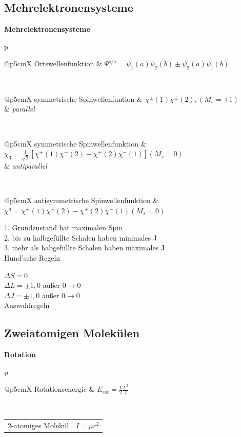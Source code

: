 \documentclass[12pt,a4paper, twoside]{article}
\makeatletter
\renewcommand{\=}[1]{\stackrel{#1}{=}}
\theoremstyle{definition}
\theoremstyle{remark}
\newcommand{\concept}[2]{%
\noindent
\begin{framed}
\noindent\textbf{#1}
\par\begin{tabular}{p{\linewidth}}
#2
\end{tabular}
\end{framed}
}
\newcommand{\fnote}[3]{%
\noindent\begin{tabularx}{\linewidth}{@{}p{5cm}X}
#1 & $#2$\\
& \textit{\small{#3}}
\end{tabularx}}
\newcommand{\f}[2]{%
\noindent\begin{tabularx}{\linewidth}{@{}p{5cm}X}
#1 & $#2$
\end{tabularx}}
\makeatother
\begin{document}
\subsection{Mehrelektronensysteme}

\concept{Mehrelektronensysteme}{
\f{Ortswellenfunktion}{\Psi^{s/a} = \psi_1 (a) \psi_2(b) \pm \psi_2(a) \psi_1(b)}\\
\fnote{symmetrische Spinwellenfuntion}{\chi^{\pm}(1) \chi^{\pm}(2), (M_s = \pm 1)}{parallel}\\
\fnote{symmetrische Spinwellenfunktion}{\chi_3 = \frac{1}{\sqrt{2}} [\chi^+ (1) \chi^- (2) + \chi^+ (2) \chi^- (1)] (M_s = 0)}{antiparallel}\\
\f{antisymmetrische Spinwellenfunktion}{\chi^a = \chi^+ (1) \chi^- (2) - \chi^+ (2) \chi^- (1) (M_s = 0)}

}

\begin{center}
\begin{framed}
	1. Grundzustand hat maximalen Spin\\
	2. bis zu halbgefüllte Schalen haben minimales J\\
	3. mehr als habgefüllte Schalen haben maximales J\\
Hund'sche Regeln
\end{framed}
\end{center}

\begin{center}
\begin{framed}
	$\Delta S = 0$\\
	$\Delta L = \pm 1, 0$ außer $0 \rightarrow 0$\\
	$\Delta J = \pm 1, 0$ außer $0 \rightarrow 0$\\
Auswahlregeln
\end{framed}
\end{center}

\subsection{Zweiatomigen Molekülen}

\concept{Rotation}{
\f{Rotationsenergie}{E_{rot} = \frac{1}{2} \frac{L^2}{I}}\\
\f{2-atomiges Molekül}{I = \mu r^2}
}
\end{document}
